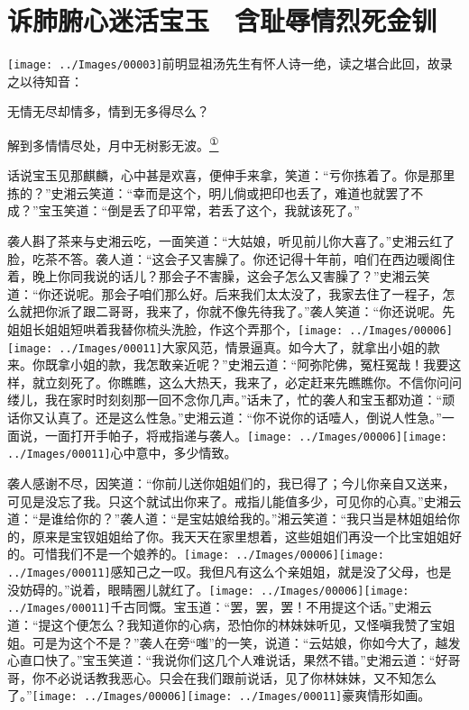 

\chapter{诉肺腑心迷活宝玉　含耻辱情烈死金钏}\label{part0036_split_000.htmlux5cux23calibre_pb_0}

{\texttt{[image: ../Images/00003]}前明显祖汤先生有怀人诗一绝，读之堪合此回，故录之以待知音：}

{无情无尽却情多，情到无多得尽么？}

{解到多情情尽处，月中无树影无波。}\href{../Text/part0036_split_000.html\#lnkback_1_a}{\textsuperscript{①}}

话说宝玉见那麒麟，心中甚是欢喜，便伸手来拿，笑道：``亏你拣着了。你是那里拣的？''史湘云笑道：``幸而是这个，明儿倘或把印也丢了，难道也就罢了不成？''宝玉笑道：``倒是丢了印平常，若丢了这个，我就该死了。''

袭人斟了茶来与史湘云吃，一面笑道：``大姑娘，听见前儿你大喜了。''史湘云红了脸，吃茶不答。袭人道：``这会子又害臊了。你还记得十年前，咱们在西边暖阁住着，晚上你同我说的话儿？那会子不害臊，这会子怎么又害臊了？''史湘云笑道：``你还说呢。那会子咱们那么好。后来我们太太没了，我家去住了一程子，怎么就把你派了跟二哥哥，我来了，你就不像先待我了。''袭人笑道：``你还说呢。先姐姐长姐姐短哄着我替你梳头洗脸，作这个弄那个，{\texttt{[image: ../Images/00006]}\texttt{[image: ../Images/00011]}\footnotesize \kaishu 大家风范，情景逼真。}如今大了，就拿出小姐的款来。你既拿小姐的款，我怎敢亲近呢？''史湘云道：``阿弥陀佛，冤枉冤哉！我要这样，就立刻死了。你瞧瞧，这么大热天，我来了，必定赶来先瞧瞧你。不信你问问缕儿，我在家时时刻刻那一回不念你几声。''话未了，忙的袭人和宝玉都劝道：``顽话你又认真了。还是这么性急。''史湘云道：``你不说你的话噎人，倒说人性急。''一面说，一面打开手帕子，将戒指递与袭人。{\texttt{[image: ../Images/00006]}\texttt{[image: ../Images/00011]}\footnotesize \kaishu 心中意中，多少情致。}

袭人感谢不尽，因笑道：``你前儿送你姐姐们的，我已得了；今儿你亲自又送来，可见是没忘了我。只这个就试出你来了。戒指儿能值多少，可见你的心真。''史湘云道：``是谁给你的？''袭人道：``是宝姑娘给我的。''湘云笑道：``我只当是林姐姐给你的，原来是宝钗姐姐给了你。我天天在家里想着，这些姐姐们再没一个比宝姐姐好的。可惜我们不是一个娘养的。{\texttt{[image: ../Images/00006]}\texttt{[image: ../Images/00011]}\footnotesize \kaishu 感知己之一叹。}我但凡有这么个亲姐姐，就是没了父母，也是没妨碍的。''说着，眼睛圈儿就红了。{\texttt{[image: ../Images/00006]}\texttt{[image: ../Images/00011]}\footnotesize \kaishu 千古同慨。}宝玉道：``罢，罢，罢！不用提这个话。''史湘云道：``提这个便怎么？我知道你的心病，恐怕你的林妹妹听见，又怪嗔我赞了宝姐姐。可是为这个不是？''袭人在旁``嗤''的一笑，说道：``云姑娘，你如今大了，越发心直口快了。''宝玉笑道：``我说你们这几个人难说话，果然不错。''史湘云道：``好哥哥，你不必说话教我恶心。只会在我们跟前说话，见了你林妹妹，又不知怎么了。''{\texttt{[image: ../Images/00006]}\texttt{[image: ../Images/00011]}\footnotesize \kaishu 豪爽情形如画。}

